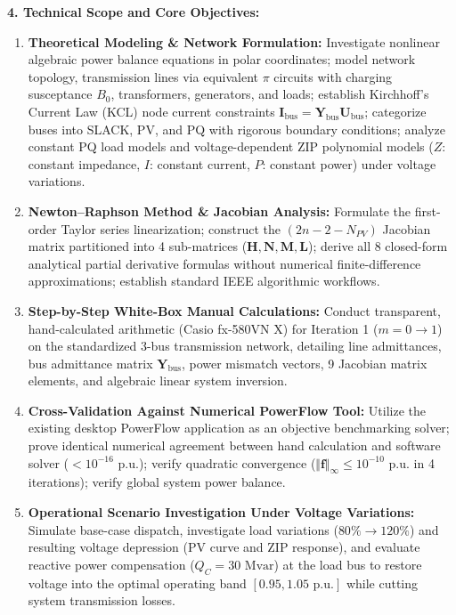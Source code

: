 \documentclass[12pt,a4paper,oneside]{report}
\begin{document}
\noindent \textbf{4. Technical Scope and Core Objectives:}
\begin{enumerate}
    \item \textbf{Theoretical Modeling \& Network Formulation:} Investigate nonlinear algebraic power balance equations in polar coordinates; model network topology, transmission lines via equivalent $\pi$ circuits with charging susceptance $B_0$, transformers, generators, and loads; establish Kirchhoff's Current Law (KCL) node current constraints $\mathbf{I}_{\text{bus}} = \mathbf{Y}_{\text{bus}}\mathbf{U}_{\text{bus}}$; categorize buses into SLACK, PV, and PQ with rigorous boundary conditions; analyze constant PQ load models and voltage-dependent ZIP polynomial models ($Z$: constant impedance, $I$: constant current, $P$: constant power) under voltage variations.
    \item \textbf{Newton--Raphson Method \& Jacobian Analysis:} Formulate the first-order Taylor series linearization; construct the $(2n - 2 - N_{PV})$ Jacobian matrix partitioned into 4 sub-matrices ($\mathbf{H}, \mathbf{N}, \mathbf{M}, \mathbf{L}$); derive all 8 closed-form analytical partial derivative formulas without numerical finite-difference approximations; establish standard IEEE algorithmic workflows.
    \item \textbf{Step-by-Step White-Box Manual Calculations:} Conduct transparent, hand-calculated arithmetic (Casio fx-580VN X) for Iteration 1 ($m = 0 \to 1$) on the standardized 3-bus transmission network, detailing line admittances, bus admittance matrix $\mathbf{Y}_{\text{bus}}$, power mismatch vectors, 9 Jacobian matrix elements, and algebraic linear system inversion.
    \item \textbf{Cross-Validation Against Numerical PowerFlow Tool:} Utilize the existing desktop PowerFlow application as an objective benchmarking solver; prove identical numerical agreement between hand calculation and software solver ($< 10^{-16}\text{ p.u.}$); verify quadratic convergence ($\Vert \mathbf{f} \Vert_\infty \le 10^{-10}\text{ p.u.}$ in 4 iterations); verify global system power balance.
    \item \textbf{Operational Scenario Investigation Under Voltage Variations:} Simulate base-case dispatch, investigate load variations ($80\% \to 120\%$) and resulting voltage depression (PV curve and ZIP response), and evaluate reactive power compensation ($Q_C = 30\text{ Mvar}$) at the load bus to restore voltage into the optimal operating band $[0.95, 1.05\text{ p.u.}]$ while cutting system transmission losses.
\end{enumerate}
\end{document}
